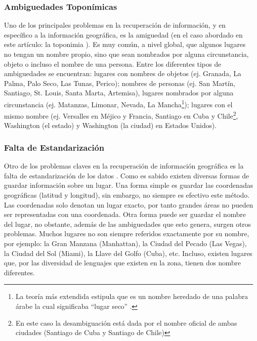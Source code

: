 \documentclass{llncs}
\begin{document}
\subsubsection{Ambiguedades Toponímicas}\label{sec:ambig}

Uno de los principales problemas en la recuperación de información, y en
específico a la información geográfica, es la amiguedad (en el caso abordado en
este artículo: la toponimia \cite{buscaldi2009}). Es muy común, a nivel global,
que algunos lugares no tengan un nombre propio, sino que sean nombrados por
alguna circunstancia, objeto o incluso el nombre de una persona. Entre los
diferentes tipos de ambiguedades se encuentran: lugares con nombres de objetos (ej.
Granada, La Palma, Palo Seco, Las Tunas, Perico); nombres de personas
(ej. San Martín, Santiago, St. Louis, Santa Marta, Artemisa), lugares nombrados
por alguna circunstancia (ej. Matanzas, Limonar, Nevada, La Mancha\footnote{La
teoría más extendida estipula que es un nombre heredado de una palabra árabe la
cual significaba ``lugar seco'' \cite{laMancha}.}); lugares con el mismo nombre
(ej. Versalles en Méjico y Francia, Santiago en Cuba y Chile\footnote{En este
caso la desambiguación está dada por el nombre oficial de ambas ciudades
(Santiago de Cuba y Santiago de Chile)}, Washington (el estado) y Washington (la
ciudad) en Estados Unidos).

\subsubsection{Falta de Estandarización}\label{sec:estand}

Otro de los problemas claves en la recuperación de información geográfica es la
falta de estandarización de los datos \cite{deAndrade2014}. Como es sabido
existen diversas formas de guardar información sobre un lugar. Una forma simple
es guardar las coordenadas geográficas (latitud y longitud), sin
embargo, no siempre es efectivo este método. Las coordenadas solo denotan un
lugar exacto, por tanto grandes áreas no pueden ser representadas con una
coordenada. Otra forma puede ser guardar el nombre del lugar, no obstante,
además de las ambiguedades que esto genera, surgen otros problemas. Muchos
lugares no son siempre referidos exactamente por su nombre, por ejemplo: la
Gran Manzana (Manhattan), la Ciudad del Pecado (Las Vegas), la Ciudad del Sol
(Miami), la Llave del Golfo (Cuba), etc. Incluso, existen lugares que, por las
diversidad de lenguajes que existen en la zona, tienen dos nombre diferentes.
\end{document}
